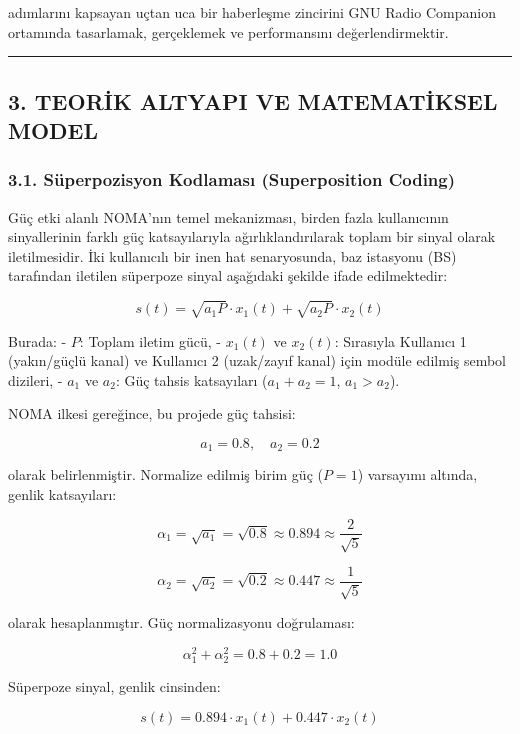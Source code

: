 \documentclass[
]{IEEEtran}
\begin{document}
\begin{longtable}[]
adımlarını kapsayan uçtan uca bir haberleşme zincirini GNU Radio
Companion ortamında tasarlamak, gerçeklemek ve performansını
değerlendirmektir.

\begin{center}\rule{0.5\linewidth}{0.5pt}\end{center}

\subsection{3. TEORİK ALTYAPI VE MATEMATİKSEL
MODEL}\label{teorik-altyapi-ve-matematiksel-model}

\subsubsection{3.1. Süperpozisyon Kodlaması (Superposition
Coding)}\label{suxfcperpozisyon-kodlamasux131-superposition-coding}

Güç etki alanlı NOMA'nın temel mekanizması, birden fazla kullanıcının
sinyallerinin farklı güç katsayılarıyla ağırlıklandırılarak toplam bir
sinyal olarak iletilmesidir. İki kullanıcılı bir inen hat senaryosunda,
baz istasyonu (BS) tarafından iletilen süperpoze sinyal aşağıdaki
şekilde ifade edilmektedir:

\[s(t) = \sqrt{a_1 P} \cdot x_1(t) + \sqrt{a_2 P} \cdot x_2(t)\]

Burada: - \(P\): Toplam iletim gücü, - \(x_1(t)\) ve \(x_2(t)\):
Sırasıyla Kullanıcı 1 (yakın/güçlü kanal) ve Kullanıcı 2 (uzak/zayıf
kanal) için modüle edilmiş sembol dizileri, - \(a_1\) ve \(a_2\): Güç
tahsis katsayıları (\(a_1 + a_2 = 1\), \(a_1 > a_2\)).

NOMA ilkesi gereğince, bu projede güç tahsisi:

\[a_1 = 0.8, \quad a_2 = 0.2\]

olarak belirlenmiştir. Normalize edilmiş birim güç (\(P = 1\)) varsayımı
altında, genlik katsayıları:

\[\alpha_1 = \sqrt{a_1} = \sqrt{0.8} \approx 0.894 \approx \frac{2}{\sqrt{5}}\]

\[\alpha_2 = \sqrt{a_2} = \sqrt{0.2} \approx 0.447 \approx \frac{1}{\sqrt{5}}\]

olarak hesaplanmıştır. Güç normalizasyonu doğrulaması:

\[\alpha_1^2 + \alpha_2^2 = 0.8 + 0.2 = 1.0\]

Süperpoze sinyal, genlik cinsinden:

\[s(t) = 0.894 \cdot x_1(t) + 0.447 \cdot x_2(t)\]


\end{longtable}
\end{document}

